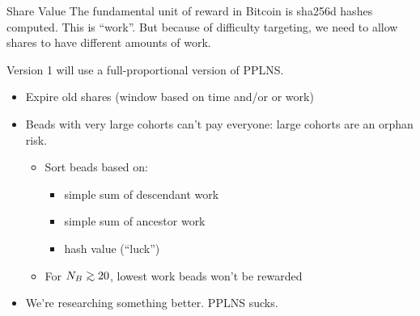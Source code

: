 \documentclass[tikz,mathserif,usenames,dvipsnames,svgnames,table]{beamer}
\newlength{\wideitemsep}
\newlength{\narrowitemsep}
\let\olditem\item
\renewcommand{\item}{\setlength{\itemsep}{\wideitemsep}\olditem}
\newcommand{\nitem}{\setlength{\itemsep}{\narrowitemsep}\olditem}
\def\gsim{\mathrel{\raise.3ex\hbox{$>$\kern-.75em\lower1ex\hbox{$\sim$}}}}
\begin{document}
\begin{frame}{Share Value}
    The fundamental unit of reward in Bitcoin is sha256d hashes computed. This is ``work''. But
    because of difficulty targeting, we need to allow shares to have different amounts of work.

    \vspace{0.2cm}

    Version 1 will use a full-proportional version of PPLNS.
    \begin{itemize}
        \item Expire old shares (window based on time and/or or work)
        \item Beads with very large cohorts can't pay everyone: large cohorts are an orphan risk.
            \begin{itemize}
                \item[$\Rightarrow$] Sort beads based on:
                    \begin{itemize}
                        \nitem simple sum of descendant work
                        \nitem simple sum of ancestor work
                        \nitem hash value (``luck'')
                    \end{itemize}
                \item[$\Rightarrow$] For $N_B \gsim 20$, lowest work beads won't
                    be rewarded
            \end{itemize}
        \item We're researching something better. PPLNS sucks.
    \end{itemize}
\end{frame}
\end{document}
